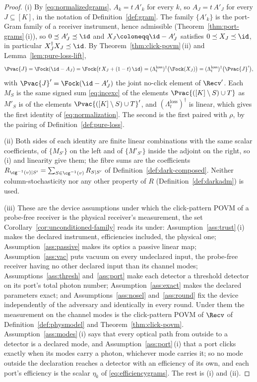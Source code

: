 \begin{proof}
(i) By \eqref{eq:normalizedgrams}, $A_k=t\,A'_k$ for every $k$, so
$A_J=t\,A'_J$ for every $J\subseteq[K]$, in the notation of
Definition~\ref{def:gram}. The family $\{A'_k\}$ is the port-Gram family of a
receiver instrument, hence admissible (Theorem~\ref{thm:port-grams}\,(i)), so
$0\preceq A'_J\preceq\id$ and $X_J\coloneqq\id-A'_J$ satisfies
$0\preceq X_J\preceq\id$, in particular $X_J^{\dagger}X_J\preceq\id$. By
Theorem~\ref{thm:click-povm}\,(ii) and Lemma~\ref{lem:pure-loss-lift},
\begin{equation*}
  \Pvac{J}=\Fock(\id-A_J)=\Fock\big(t\,X_J+(1-t)\,\id\big)
  =(\Lambda^{\mathrm{loss}}_t)^{\dagger}\big(\Fock(X_J)\big)
  =(\Lambda^{\mathrm{loss}}_t)^{\dagger}\big(\Pvac{J}'\big),
\end{equation*}
with $\Pvac{J}'=\Fock(\id-A'_J)$ the joint no-click element of $\Recv'$.
Each $M_S$ is the same signed sum \eqref{eq:incexc} of the elements
$\Pvac{([K]\setminus S)\cup T}$ as $M'_S$ is of the elements
$\Pvac{([K]\setminus S)\cup T}'$, and $(\Lambda^{\mathrm{loss}}_t)^{\dagger}$
is linear, which gives the first identity of \eqref{eq:normalization}. The
second is the first paired with $\rho$, by the pairing of
Definition~\ref{def:pure-loss}.

(ii) Both sides of each identity are finite linear combinations with the same
scalar coefficients, of $\{M_{S'}\}$ on the left and of $\{M'_{S'}\}$ inside
the adjoint on the right, so (i) and linearity give them; the fibre sums are
the coefficients $R_{\cg^{-1}(v)|S'}=\sum_{S\in\cg^{-1}(v)}R_{S|S'}$ of
Definition~\ref{def:dark-composed}. Neither column-stochasticity nor any other
property of $R$ (Definition~\ref{def:darkadm}) is used.

(iii) These are the device assumptions under which the click-pattern POVM
of a probe-free receiver is the physical receiver's measurement, the set
Corollary~\ref{cor:unconditioned-family} reads its  under:
Assumption~\ref{ass:trust}\,(i) makes the declared instrument, efficiencies
included, the physical one; Assumption~\ref{ass:passive} makes its optics a
passive linear map; Assumption~\ref{ass:vac} puts vacuum on every undeclared
input, the probe-free receiver having no other declared input than its
channel modes; Assumptions~\ref{ass:thresh} and~\ref{ass:port} make each
detector a threshold detector on its port's total photon number;
Assumption~\ref{ass:exact} makes the declared parameters exact; and
Assumptions~\ref{ass:nosel} and~\ref{ass:round} fix the device
independently of the adversary and identically in every round. Under them the
measurement on the channel modes is the click-pattern POVM of $\Recv$ of
Definition~\ref{def:physmodel} and Theorem~\ref{thm:click-povm}.
Assumption~\ref{ass:modes}\,(i) says that every optical path from outside to
a detector is a declared mode, and Assumption~\ref{ass:port}\,(i) that a port
clicks exactly when its modes carry a photon, whichever mode carries it; so no
mode outside the declaration reaches a detector with an efficiency of its
own, and each port's efficiency is the scalar $\eta_k$ of
\eqref{eq:efficiencygrams}. The rest is (i) and (ii).
\end{proof}
